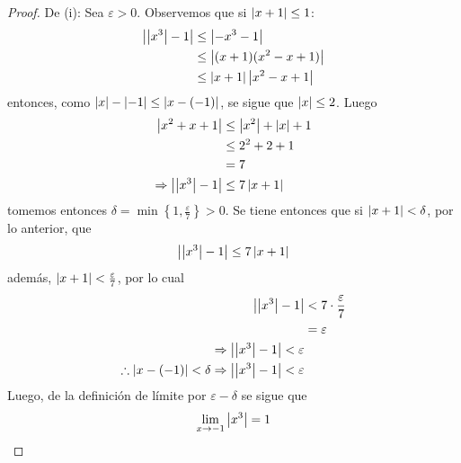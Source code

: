 \documentclass[12pt]{article}
\begin{document}
\begin{enumerate}
    \begin{proof}
        De (i): Sea $\varepsilon>0$. Observemos que si $\left| x+1 \right|\leq1$:
        \begin{equation*}
            \begin{split}
                \left| \left| x^3 \right|-1 \right|&\leq\left| -x^3-1 \right|\\
                &\leq\left| (x+1)(x^2-x+1) \right|\\
                &\leq\left| x+1 \right|\left| x^2-x+1 \right|\\
            \end{split}
        \end{equation*}
        entonces, como $\left| x \right|-\left| -1 \right|\leq\left| x-(-1) \right|$, se sigue que $\left| x \right|\leq2$. Luego
        \begin{equation*}
            \begin{split}
                \left| x^2+x+1 \right|&\leq\left| x^2 \right|+\left| x \right|+1\\
                &\leq 2^2+2+1\\
                &=7\\
                \Rightarrow \left| \left| x^3 \right|-1 \right|&\leq7\left| x+1 \right|
            \end{split}
        \end{equation*}
        tomemos entonces $\delta=\min\left\{1,\frac{\varepsilon}{7}\right\}>0$. Se tiene entonces que si $\left| x+1 \right|<\delta$, por lo anterior, que 
        \begin{equation*}
            \left| \left| x^3 \right|-1 \right|\leq7\left| x+1 \right|
        \end{equation*}
        además, $\left| x+1 \right|<\frac{\varepsilon}{7}$, por lo cual
        \begin{equation*}
            \begin{split}
                \left| \left| x^3 \right|-1 \right|&<7\cdot\frac{\varepsilon}{7}\\
                &=\varepsilon\\
                \Rightarrow \left| \left| x^3 \right|-1 \right|<\varepsilon \\
                \therefore \left| x-(-1) \right|<\delta\Rightarrow \left| \left| x^3 \right|-1 \right|<\varepsilon \\
            \end{split}
        \end{equation*}
        Luego, de la definición de límite por $\varepsilon-\delta$ se sigue que
        \begin{equation*}
            \lim_{ x\rightarrow-1}\left| x^3 \right|=1
        \end{equation*}


\end{proof}
\end{enumerate}
\end{document}
